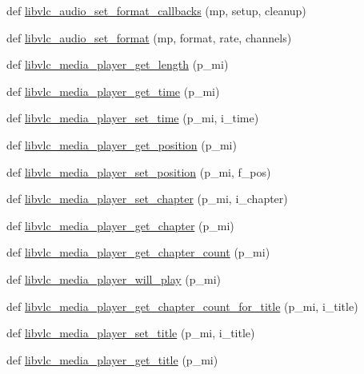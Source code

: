 \begin{DoxyCompactItemize}
\item 
def \hyperlink{namespacevlc_a0191b731e6860891d7788976a24c73b9}{libvlc\+\_\+audio\+\_\+set\+\_\+format\+\_\+callbacks} (mp, setup, cleanup)
\item 
def \hyperlink{namespacevlc_ab91a179094998e8bf3c5be9ab109e206}{libvlc\+\_\+audio\+\_\+set\+\_\+format} (mp, format, rate, channels)
\item 
def \hyperlink{namespacevlc_a203cb0f1728c244d74defe39fabf686d}{libvlc\+\_\+media\+\_\+player\+\_\+get\+\_\+length} (p\+\_\+mi)
\item 
def \hyperlink{namespacevlc_a63c5311e72fe1f8cb66ba3cf689bcdea}{libvlc\+\_\+media\+\_\+player\+\_\+get\+\_\+time} (p\+\_\+mi)
\item 
def \hyperlink{namespacevlc_a5c3c0d97463b2f97e3d68d1a2a8934dd}{libvlc\+\_\+media\+\_\+player\+\_\+set\+\_\+time} (p\+\_\+mi, i\+\_\+time)
\item 
def \hyperlink{namespacevlc_a1f0992a5cb5ad9dd56c91efbaa4c3804}{libvlc\+\_\+media\+\_\+player\+\_\+get\+\_\+position} (p\+\_\+mi)
\item 
def \hyperlink{namespacevlc_a2e1683c42a5d9814960546bf84bf2a6a}{libvlc\+\_\+media\+\_\+player\+\_\+set\+\_\+position} (p\+\_\+mi, f\+\_\+pos)
\item 
def \hyperlink{namespacevlc_a4ab44fdaf74a35fb2faa8fa6eb11a367}{libvlc\+\_\+media\+\_\+player\+\_\+set\+\_\+chapter} (p\+\_\+mi, i\+\_\+chapter)
\item 
def \hyperlink{namespacevlc_aa17d018cd364f0d9248f7dacf0ce6686}{libvlc\+\_\+media\+\_\+player\+\_\+get\+\_\+chapter} (p\+\_\+mi)
\item 
def \hyperlink{namespacevlc_aff9bc2c045b943e08689f0880af3c9ff}{libvlc\+\_\+media\+\_\+player\+\_\+get\+\_\+chapter\+\_\+count} (p\+\_\+mi)
\item 
def \hyperlink{namespacevlc_af96b4d82a14cecf87ad162cd688dd86e}{libvlc\+\_\+media\+\_\+player\+\_\+will\+\_\+play} (p\+\_\+mi)
\item 
def \hyperlink{namespacevlc_a9c238cb76d091ddb073f43ec17c559df}{libvlc\+\_\+media\+\_\+player\+\_\+get\+\_\+chapter\+\_\+count\+\_\+for\+\_\+title} (p\+\_\+mi, i\+\_\+title)
\item 
def \hyperlink{namespacevlc_a046141b3f0caa945606a55fd49c07a7f}{libvlc\+\_\+media\+\_\+player\+\_\+set\+\_\+title} (p\+\_\+mi, i\+\_\+title)
\item 
def \hyperlink{namespacevlc_af14b0c9e3e60e215a97f32ee65a5bb2d}{libvlc\+\_\+media\+\_\+player\+\_\+get\+\_\+title} (p\+\_\+mi)
\item 

\end{DoxyCompactItemize}
